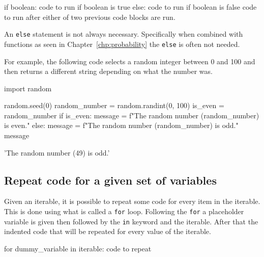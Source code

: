 \begin{api}
if boolean:
    code to run if boolean is true
else:
    code to run if boolean is false
code to run after either of two previous code blocks are run.
\end{api}



\begin{note}
An \texttt{else} statement is not always necessary. Specifically when combined with
functions as seen in Chapter~\ref{chp:probability}
the \texttt{else} is often not needed.
\end{note}


For example, the following code selects a random integer between 0 and 100 and
then returns a different string depending on what the number was.




\begin{pyin}
import random

random.seed(0)
random_number = random.randint(0, 100)
is_even = random_number %
if is_even:
    message = f"The random number ({random_number}) is even."
else:
    message = f"The random number ({random_number}) is odd."
message
\end{pyin}





\begin{raw}
'The random number (49) is odd.'
\end{raw}





\subsection{Repeat code \textbf{for} a given set of variables}
\label{\detokenize{building-tools/01-variables-conditionals-loops/how/main:repeat-code-for-a-given-set-of-variables}}

Given an iterable, it is possible to repeat some code for every item in the
iterable. This is done using what is called a \texttt{for} loop. Following the
\texttt{for} a
placeholder variable is given then followed by the \texttt{in} keyword and the iterable.
After that the indented code that will be repeated for every value of the
iterable.


\begin{api}
for dummy_variable in iterable:
    code to repeat
\end{api}




